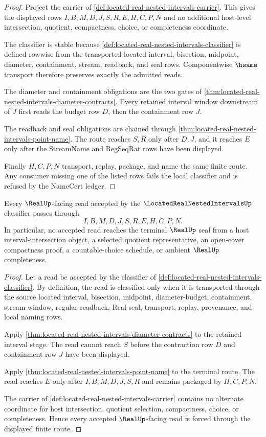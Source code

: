 \begin{proof}
Project the carrier of \autoref{def:located-real-nested-intervals-carrier}. This gives the displayed rows $I,B,M,D,J,S,R,E,H,C,P,N$ and no additional host-level intersection, quotient, compactness, choice, or completeness coordinate.

The classifier is stable because \autoref{def:located-real-nested-intervals-classifier} is defined rowwise from the transported located interval, bisection, midpoint, diameter, containment, stream, readback, and seal rows. Componentwise $\hsame$ transport therefore preserves exactly the admitted reads.

The diameter and containment obligations are the two gates of \autoref{thm:located-real-nested-intervals-diameter-contracts}. Every retained interval window downstream of $J$ first reads the budget row $D$, then the containment row $J$.

The readback and seal obligations are chained through \autoref{thm:located-real-nested-intervals-point-name}. The route reaches $S,R$ only after $D,J$, and it reaches $E$ only after the StreamName and RegSeqRat rows have been displayed.

Finally $H,C,P,N$ transport, replay, package, and name the same finite route. Any consumer missing one of the listed rows fails the local classifier and is refused by the NameCert ledger.
\end{proof}

\begin{theorem}
\label{thm:located-real-nested-intervals-real-seal-nonescape}
Every $\RealUp$-facing read accepted by the $\LocatedRealNestedIntervalsUp$ classifier passes through
$$
I,B,M,D,J,S,R,E,H,C,P,N .
$$
In particular, no accepted read reaches the terminal $\RealUp$ seal from a host interval-intersection object, a selected quotient representative, an open-cover compactness proof, a countable-choice schedule, or ambient $\RealUp$ completeness.
\end{theorem}
\begin{proof}
Let a read be accepted by the classifier of \autoref{def:located-real-nested-intervals-classifier}. By definition, the read is classified only when it is transported through the source located interval, bisection, midpoint, diameter-budget, containment, stream-window, regular-readback, Real-seal, transport, replay, provenance, and local naming rows.

Apply \autoref{thm:located-real-nested-intervals-diameter-contracts} to the retained interval stage. The read cannot reach $S$ before the contraction row $D$ and containment row $J$ have been displayed.

Apply \autoref{thm:located-real-nested-intervals-point-name} to the terminal route. The read reaches $E$ only after $I,B,M,D,J,S,R$ and remains packaged by $H,C,P,N$.

The carrier of \autoref{def:located-real-nested-intervals-carrier} contains no alternate coordinate for host intersection, quotient selection, compactness, choice, or completeness. Hence every accepted $\RealUp$-facing read is forced through the displayed finite route.
\end{proof}

